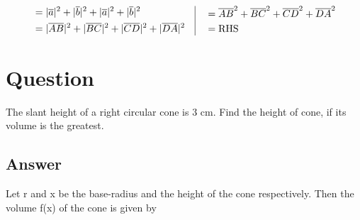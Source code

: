 \documentclass[17pt]{extarticle}
\begin{document}
\begin{fleqn}
\begin{equation} \nonumber
\begin{alignedat}{4}
&= |\overline{a}|^2 + |\overline{b}|^2 +|\overline{a}|^2 +|\overline{b}|^2  \\
&= |\overline{AB}|^2 + |\overline{BC}|^2 +|\overline{CD}|^2 +|\overline{DA}|^2  \\
\end{alignedat}
\quad
\vrule
\quad
\begin{alignedat}{4}
&= \overline{AB}^2 + \overline{BC}^2 +\overline{CD}^2 +\overline{DA}^2 \\ &= \text{RHS}
\end{alignedat}
\end{equation}



\section{Question}
The slant height of a right circular cone is 3 cm. Find the height of cone, if its volume is the greatest.


\subsection*{Answer}
Let  r  and x  be the base-radius and the height of the cone respectively. Then the volume f(x) of the cone is given by


\end{fleqn}
\end{document}
